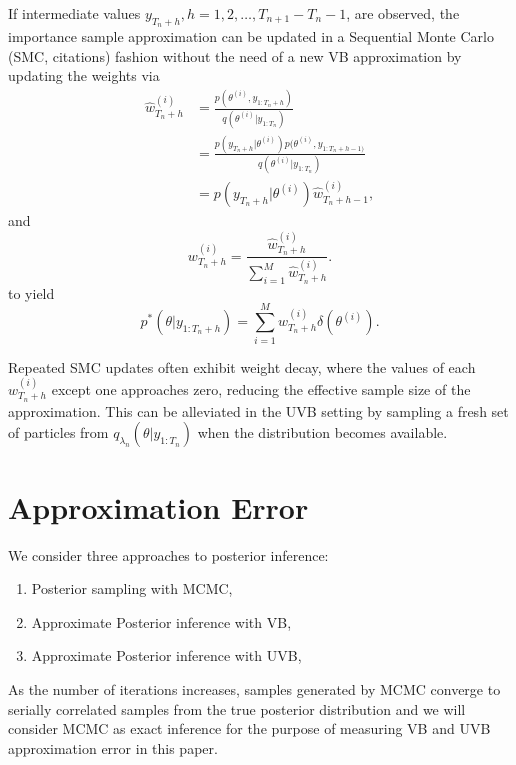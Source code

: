 \documentclass[12pt,a4paper]{article}\usepackage[]{graphicx}\usepackage[]{color}
\begin{document}
If intermediate values $y_{T_n+h}, h = 1, 2, \dots, T_{n+1} - T_{n} - 1$, are observed, the importance sample approximation can be updated in a Sequential Monte Carlo (SMC, citations) fashion without the need of a new VB approximation by updating the weights via
\begin{align}
\hat{w}^{(i)}_{T_n+h} &= \frac{p(\theta^{(i)}, y_{1:T_n+h})}{q(\theta^{(i)} | y_{1:T_n})} \nonumber \\
&= \frac{p(y_{T_n+h} | \theta^{(i)})p(\theta^{(i)}, y_{1:T_n+h-1)}}{q(\theta^{(i)} | y_{1:T_n})} \nonumber \\
&= p(y_{T_n+h} | \theta^{(i)}) \hat{w}^{(i)}_{T_n+h-1}, \label{IS:UpdateWeights}
\end{align}
and
\begin{equation}
\label{IS:UpdateWeightsNorm}
w^{(i)}_{T_n+h} = \frac{\hat{w}^{(i)}_{T_n+h}}{\sum_{i=1}^M \hat{w}^{(i)}_{T_n+h}}.
\end{equation}
to yield
\begin{equation}
\label{IS:ApproxUpdate}
p^*(\theta | y_{1:T_n+h}) = \sum_{i=1}^M w^{(i)}_{T_n+h} \delta(\theta^{(i)}).
\end{equation}

Repeated SMC updates often exhibit weight decay, where the values of each $w^{(i)}_{T_n+h}$ except one approaches zero, reducing the effective sample size of the approximation. This can be alleviated in the UVB setting by sampling a fresh set of particles from $q_{\lambda_n}(\theta | y_{1:T_n})$ when the distribution becomes available.

\section{Approximation Error}

We consider three approaches to posterior inference:
\begin{enumerate}
\item Posterior sampling with MCMC,
\item Approximate Posterior inference with VB,
\item Approximate Posterior inference with UVB,
\end{enumerate}

As the number of iterations increases, samples generated by MCMC converge to serially correlated samples from the true posterior distribution and we will consider MCMC as exact inference for the purpose of measuring VB and UVB approximation error in this paper.
\\
\end{document}
